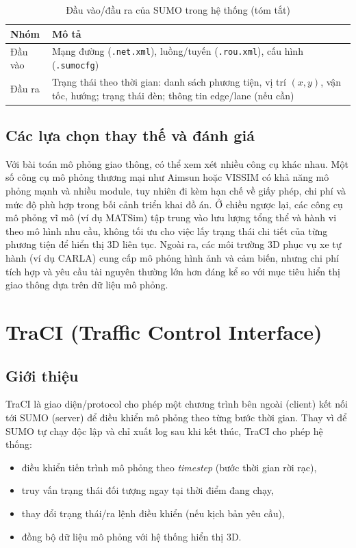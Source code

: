 \documentclass[../DoAn.tex]{subfiles}
\begin{document}
\begin{table}[H]
	\centering
	\caption{Đầu vào/đầu ra của SUMO trong hệ thống (tóm tắt)}
	\label{tab:sumo-io}
	\begin{tabular}{p{} p{}}
		\hline
		\textbf{Nhóm} & \textbf{Mô tả}\\
		\hline
		Đầu vào & Mạng đường (\texttt{.net.xml}), luồng/tuyến (\texttt{.rou.xml}), cấu hình (\texttt{.sumocfg})\\
		Đầu ra & Trạng thái theo thời gian: danh sách phương tiện, vị trí \((x,y)\), vận tốc, hướng; trạng thái đèn; thông tin edge/lane (nếu cần)\\
		\hline
	\end{tabular}
\end{table}

\subsection{Các lựa chọn thay thế và đánh giá}
Với bài toán mô phỏng giao thông, có thể xem xét nhiều công cụ khác nhau. Một số công cụ mô phỏng thương mại như Aimsun hoặc VISSIM có khả năng mô phỏng mạnh và nhiều module, tuy nhiên đi kèm hạn chế về giấy phép, chi phí và mức độ phù hợp trong bối cảnh triển khai đồ án. Ở chiều ngược lại, các công cụ mô phỏng vĩ mô (ví dụ MATSim) tập trung vào lưu lượng tổng thể và hành vi theo mô hình nhu cầu, không tối ưu cho việc lấy trạng thái chi tiết của từng phương tiện để hiển thị 3D liên tục. Ngoài ra, các môi trường 3D phục vụ xe tự hành (ví dụ CARLA) cung cấp mô phỏng hình ảnh và cảm biến, nhưng chi phí tích hợp và yêu cầu tài nguyên thường lớn hơn đáng kể so với mục tiêu hiển thị giao thông dựa trên dữ liệu mô phỏng.

\section{TraCI (Traffic Control Interface)}
\subsection{Giới thiệu}
\gls{TraCI} là giao diện/protocol cho phép một chương trình bên ngoài (client) kết nối tới SUMO (server) để điều khiển mô phỏng theo từng bước thời gian. Thay vì để SUMO tự chạy độc lập và chỉ xuất log sau khi kết thúc, TraCI cho phép hệ thống:
\begin{itemize}[leftmargin=2em]
	\item điều khiển tiến trình mô phỏng theo \textit{timestep} (bước thời gian rời rạc),
	\item truy vấn trạng thái đối tượng ngay tại thời điểm đang chạy,
	\item thay đổi trạng thái/ra lệnh điều khiển (nếu kịch bản yêu cầu),
	\item đồng bộ dữ liệu mô phỏng với hệ thống hiển thị 3D.
\end{itemize}
\end{document}
